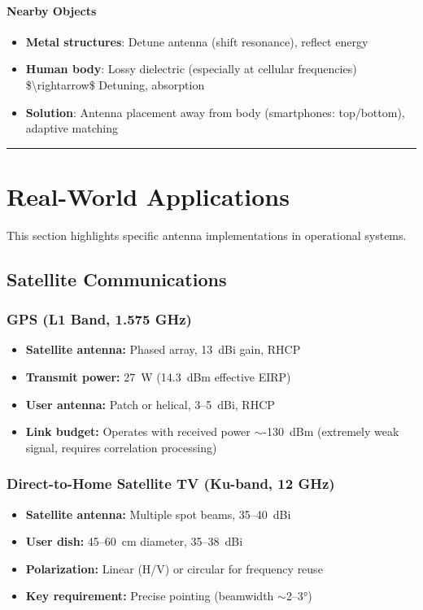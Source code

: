 \paragraph{Nearby Objects}\label{nearby-objects}

\begin{itemize}
\tightlist
\item
  \textbf{Metal structures}: Detune antenna (shift resonance), reflect
  energy
\item
  \textbf{Human body}: Lossy dielectric (especially at cellular
  frequencies) \$\textbackslash rightarrow\$ Detuning, absorption
\item
  \textbf{Solution}: Antenna placement away from body (smartphones:
  top/bottom), adaptive matching
\end{itemize}

\begin{center}\rule{0.5\linewidth}{0.5pt}\end{center}

\section{Real-World Applications}

This section highlights specific antenna implementations in operational systems.

\subsection{Satellite Communications}

\subsubsection{GPS (L1 Band, 1.575 GHz)}
\begin{itemize}
\item \textbf{Satellite antenna:} Phased array, 13~dBi gain, RHCP
\item \textbf{Transmit power:} 27~W (14.3~dBm effective EIRP)
\item \textbf{User antenna:} Patch or helical, 3--5~dBi, RHCP
\item \textbf{Link budget:} Operates with received power $\sim$-130~dBm (extremely weak signal, requires correlation processing)
\end{itemize}

\subsubsection{Direct-to-Home Satellite TV (Ku-band, 12 GHz)}
\begin{itemize}
\item \textbf{Satellite antenna:} Multiple spot beams, 35--40~dBi
\item \textbf{User dish:} 45--60~cm diameter, 35--38~dBi
\item \textbf{Polarization:} Linear (H/V) or circular for frequency reuse
\item \textbf{Key requirement:} Precise pointing (beamwidth $\sim$2--3$°$)
\end{itemize}

